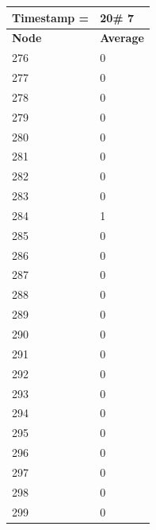 \begin{tabular}{|l||l|}
\hline
\textbf{Timestamp =} & \textbf{20}\# 7\\\hline
	\textbf{Node} & \textbf{Average} \\ \hline
\hline
	276 & 0 \\ \hline
	277 & 0 \\ \hline
	278 & 0 \\ \hline
	279 & 0 \\ \hline
	280 & 0 \\ \hline
	281 & 0 \\ \hline
	282 & 0 \\ \hline
	283 & 0 \\ \hline
	284 & 1 \\ \hline
	285 & 0 \\ \hline
	286 & 0 \\ \hline
	287 & 0 \\ \hline
	288 & 0 \\ \hline
	289 & 0 \\ \hline
	290 & 0 \\ \hline
	291 & 0 \\ \hline
	292 & 0 \\ \hline
	293 & 0 \\ \hline
	294 & 0 \\ \hline
	295 & 0 \\ \hline
	296 & 0 \\ \hline
	297 & 0 \\ \hline
	298 & 0 \\ \hline
	299 & 0 \\ \hline
\end{tabular}

